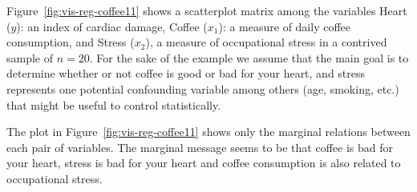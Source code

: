 \documentclass[11pt]{article}%
\newcommand*{\figref}[1]{Figure~\ref{#1}}
\begin{document}
\figref{fig:vis-reg-coffee11} shows a scatterplot matrix among the variables
Heart ($y$): an index of cardiac damage, Coffee ($x_1$): a measure of daily
coffee consumption, and Stress ($x_2$), a measure of occupational stress in a contrived
sample of $n=20$. For the sake of the example we assume that the main goal is
to determine whether or not coffee is good or bad for your heart, and stress
represents one potential confounding variable among others (age, smoking, etc.)
that might be useful to control statistically.

The plot in \figref{fig:vis-reg-coffee11} shows only the marginal relations
between each pair of variables. The marginal message seems to be that coffee is
bad for your heart, stress is bad for your heart and coffee consumption is 
also related to occupational stress.
\end{document}
